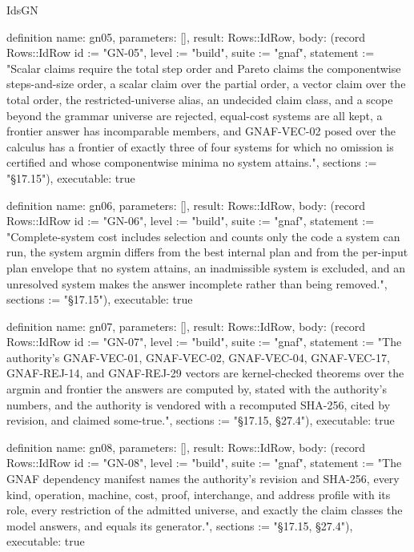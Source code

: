 \begin{lexlean}{IdsGN}
\begin{semanticmodule}
definition{
  name: gn05,
  parameters: [],
  result: Rows::IdRow,
  body: (record Rows::IdRow {id := "GN-05", level := "build", suite := "gnaf", statement := "Scalar claims require the total step order and Pareto claims the componentwise steps-and-size order, a scalar claim over the partial order, a vector claim over the total order, the restricted-universe alias, an undecided claim class, and a scope beyond the grammar universe are rejected, equal-cost systems are all kept, a frontier answer has incomparable members, and GNAF-VEC-02 posed over the calculus has a frontier of exactly three of four systems for which no omission is certified and whose componentwise minima no system attains.", sections := "§17.15"}),
  executable: true
}

definition{
  name: gn06,
  parameters: [],
  result: Rows::IdRow,
  body: (record Rows::IdRow {id := "GN-06", level := "build", suite := "gnaf", statement := "Complete-system cost includes selection and counts only the code a system can run, the system argmin differs from the best internal plan and from the per-input plan envelope that no system attains, an inadmissible system is excluded, and an unresolved system makes the answer incomplete rather than being removed.", sections := "§17.15"}),
  executable: true
}

definition{
  name: gn07,
  parameters: [],
  result: Rows::IdRow,
  body: (record Rows::IdRow {id := "GN-07", level := "build", suite := "gnaf", statement := "The authority's GNAF-VEC-01, GNAF-VEC-02, GNAF-VEC-04, GNAF-VEC-17, GNAF-REJ-14, and GNAF-REJ-29 vectors are kernel-checked theorems over the argmin and frontier the answers are computed by, stated with the authority's numbers, and the authority is vendored with a recomputed SHA-256, cited by revision, and claimed some-true.", sections := "§17.15, §27.4"}),
  executable: true
}

definition{
  name: gn08,
  parameters: [],
  result: Rows::IdRow,
  body: (record Rows::IdRow {id := "GN-08", level := "build", suite := "gnaf", statement := "The GNAF dependency manifest names the authority's revision and SHA-256, every kind, operation, machine, cost, proof, interchange, and address profile with its role, every restriction of the admitted universe, and exactly the claim classes the model answers, and equals its generator.", sections := "§17.15, §27.4"}),
  executable: true
}


\end{semanticmodule}
\end{lexlean}

